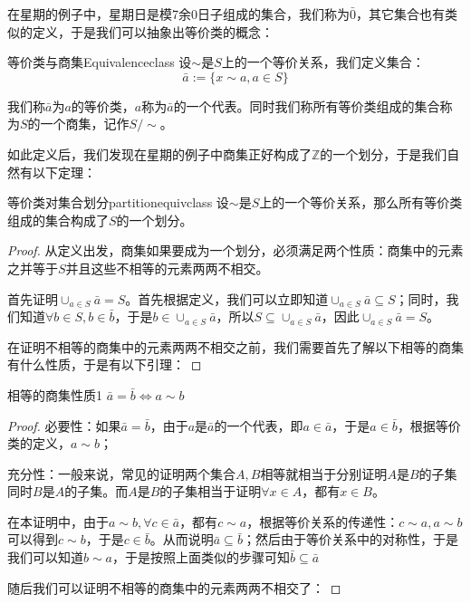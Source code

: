    在星期的例子中，星期日是模7余0日子组成的集合，我们称为$\bar{0}$，其它集合也有类似的定义，于是我们可以抽象出等价类的概念：
   \begin{definition}{等价类与商集}{Equivalenceclass}
   设$\sim$是$S$上的一个等价关系，我们定义集合：
   \begin{equation}
       \bar{a}:=\{x\sim a,a\in S\}
   \end{equation}
   
   我们称$\bar{a}$为$a$的等价类，$a$称为$\bar{a}$的一个代表。同时我们称所有等价类组成的集合称为$S$的一个商集，记作$S/\sim$。
   \end{definition}
   
   如此定义后，我们发现在星期的例子中商集正好构成了$\mathbb{Z}$的一个划分，于是我们自然有以下定理：
   \begin{theorem}{等价类对集合划分}{partitionequivclass}
       设$\sim$是$S$上的一个等价关系，那么所有等价类组成的集合构成了$S$的一个划分。
   \end{theorem}
   
   \begin{proof}
   从定义出发，商集如果要成为一个划分，必须满足两个性质：商集中的元素之并等于$S$并且这些不相等的元素两两不相交。
   
   首先证明$\cup_{a\in S}\bar{a}=S$。首先根据定义，我们可以立即知道$\cup_{a\in S}\bar{a}\subseteq S$；同时，我们知道$\forall b\in S,b\in \bar{b}$，于是$b\in \cup_{a\in S}\bar{a}$，所以$S\subseteq \cup_{a\in S}\bar{a}$，因此$\cup_{a\in S}\bar{a}=S$。
   
   在证明不相等的商集中的元素两两不相交之前，我们需要首先了解以下相等的商集有什么性质，于是有以下引理：
   \end{proof}
   \begin{lemma}{相等的商集性质}{1}
   $\bar{a}=\bar{b}\Longleftrightarrow a\sim b$
   \end{lemma}
 \begin{proof}
   必要性：如果$\bar{a}=\bar{b}$，由于$a$是$\bar{a}$的一个代表，即$a\in \bar{a}$，于是$a\in \bar{b}$，根据等价类的定义，$a\sim b$；
   
   充分性：一般来说，常见的证明两个集合$A,B$相等就相当于分别证明$A$是$B$的子集同时$B$是$A$的子集。而$A$是$B$的子集相当于证明$\forall x\in A$，都有$x\in B$。
   
   在本证明中，由于$a\sim b,\forall c\in \bar{a}$，都有$c\sim a$，根据等价关系的传递性：$c\sim a,a\sim b$可以得到$c\sim b$，于是$c\in \bar{b}$。从而说明$\bar{a}\subseteq\bar{b}$；然后由于等价关系中的对称性，于是我们可以知道$b\sim a$，于是按照上面类似的步骤可知$\bar{b}\subseteq\bar{a}$
   
   随后我们可以证明不相等的商集中的元素两两不相交了：
 \end{proof}
   
